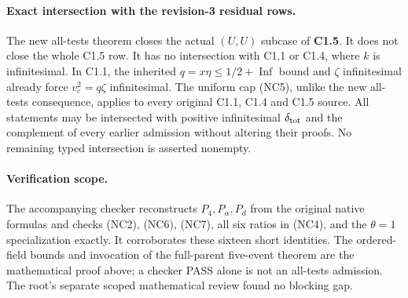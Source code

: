 \paragraph{Exact intersection with the revision-3 residual rows.}
The new all-tests theorem closes the actual $(U,U)$ subcase of
\textbf{C1.5}. It does not close the whole C1.5 row. It has no
intersection with C1.1 or C1.4, where $k$ is infinitesimal. In C1.1,
the inherited $q=x\eta\le1/2+\operatorname{Inf}$ bound and
$\zeta$ infinitesimal already force $v_c^2=q\zeta$ infinitesimal.
The uniform cap (NC5), unlike the new all-tests consequence, applies
to every original C1.1, C1.4 and C1.5 source. All statements may
be intersected with positive infinitesimal $\delta_{\rm tot}$ and
the complement of every earlier admission without altering their
proofs. No remaining typed intersection is asserted nonempty.

\paragraph{Verification scope.}
The accompanying checker reconstructs $P_4,P_\alpha,P_d$ from the
original native formulas and checks (NC2), (NC6), (NC7), all six
ratios in (NC4), and the $\theta=1$ specialization exactly. It
corroborates these sixteen short identities. The ordered-field bounds and invocation of the full-parent
five-event theorem are the mathematical proof above; a checker PASS
alone is not an all-tests admission. The root's separate scoped
mathematical review found no blocking gap.
